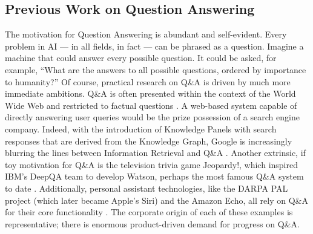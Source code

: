 \subsection{Previous Work on Question Answering}

The motivation for Question Answering is abundant and self-evident. Every problem in AI --- in all fields, in fact --- can be phrased as a question. Imagine a machine that could answer every possible question. It could be asked, for example, ``What are the answers to all possible questions, ordered by importance to humanity?'' Of course, practical research on Q\&A is driven by much more immediate ambitions. Q\&A is often presented within the context of the World Wide Web and restricted to factual questions \cite{cucerzan2005factoid, ravichandran2002learning, kwok2001scaling}. A web-based system capable of directly answering user queries would be the prize possession of a search engine company. Indeed, with the introduction of Knowledge Panels with search responses that are derived from the Knowledge Graph, Google is increasingly blurring the lines between Information Retrieval and Q\&A \cite{singhal2012introducing}. Another extrinsic, if toy motivation for Q\&A is the television trivia game Jeopardy!, which inspired IBM's DeepQA team to develop Watson, perhaps the most famous Q\&A system to date \cite{ferrucci2012introduction}. Additionally, personal assistant technologies, like the DARPA PAL project (which later became Apple's Siri) and the Amazon Echo, all rely on Q\&A for their core functionality \cite{aron2011innovative, tsiao2007natural}. The corporate origin of each of these examples is representative; there is enormous product-driven demand for progress on Q\&A.

